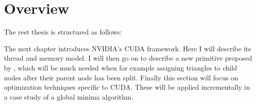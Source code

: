 


\section{Overview}

The rest thesis is structured as follows:




The next chapter introduces NVIDIA's CUDA framework. Here I will describe its
thread and memory model. I will then go on to describe a new primitive proposed
by \sengupta{}, which will be much needed when for example assigning triangles
to child nodes after their parent node has been split. Finally this section will
focus on optimization techniques specific to CUDA. These will be applied
incrementally in a case study of a global minima algorithm.


